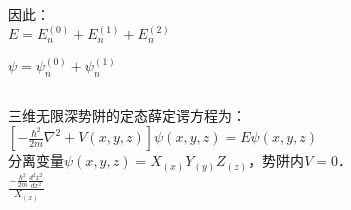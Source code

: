 因此：\\

$E = E^{(0)}_{n} + E^{(1)}_{n} + E^{(2)}_{n} $

$\psi = \psi^{(0)}_{n} + \psi^{(1)}_{n} $

\subsection{ }
三维无限深势阱的定态薛定谔方程为：\\

$\left[ -\frac{\hbar^{2}}{2m} \nabla^{2} +V(x,y,z) \right]\psi(x,y,z) = E\psi(x,y,z)$ \\

分离变量$\psi(x,y,z) = X_(x)Y_(y)Z_(z) $，势阱内$V=0$．\\

$\displaystyle \frac{-\frac{\hbar^{2}}{2m}\frac{d^{2} {x}^{2}}{d{x^{2}}}}{X_(x)}$